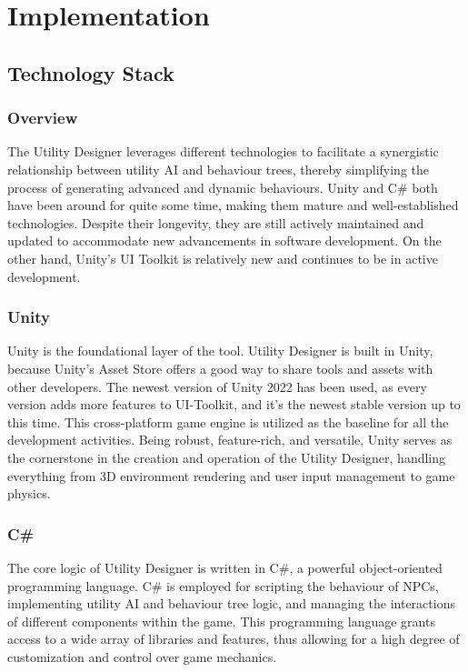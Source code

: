 \chapter{Implementation}
\label{chap:implementation}
\section{Technology Stack}
\label{sec:implementation_technologystack}

\subsection{Overview}
\label{sec:implementation_overview}

The Utility Designer leverages different technologies to facilitate a synergistic relationship between utility AI and behaviour trees, thereby simplifying the process of generating advanced and dynamic behaviours. Unity and C\# both have been around for quite some time, making them mature and well-established technologies. Despite their longevity, they are still actively maintained and updated to accommodate new advancements in software development. On the other hand, Unity's UI Toolkit is relatively new and continues to be in active development.

\subsection{Unity}
\label{sec:implementation_unity}

Unity is the foundational layer of the tool. Utility Designer is built in Unity, because Unity's Asset Store offers a good way to share tools and assets with other developers. The newest version of Unity 2022 has been used, as every version adds more features to UI-Toolkit, and it's the newest stable version up to this time. This cross-platform game engine is utilized as the baseline for all the development activities. Being robust, feature-rich, and versatile, Unity serves as the cornerstone in the creation and operation of the Utility Designer, handling everything from 3D environment rendering and user input management to game physics.

\subsection{C\#}
\label{sec:implementation_csharp}

The core logic of Utility Designer is written in C\#, a powerful object-oriented programming language. C\# is employed for scripting the behaviour of NPCs, implementing utility AI and behaviour tree logic, and managing the interactions of different components within the game. This programming language grants access to a wide array of libraries and features, thus allowing for a high degree of customization and control over game mechanics.

